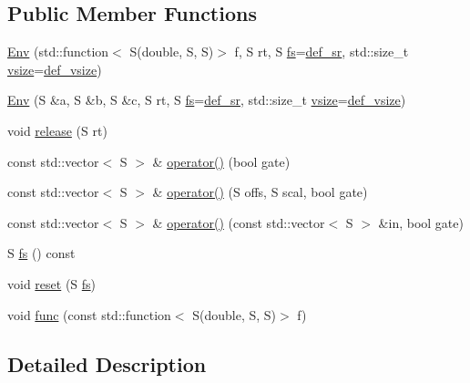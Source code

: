 \subsection*{Public Member Functions}
\begin{DoxyCompactItemize}
\item 
\hyperlink{class_aurora_1_1_env_a500fe7e05d736a21c801ffa480aceed7}{Env} (std\+::function$<$ S(double, S, S)$>$ f, S rt, S \hyperlink{class_aurora_1_1_env_a8b83ca686cce4fc31b03b1de847bc062}{fs}=\hyperlink{namespace_aurora_ad49263d809bea98dd422e95bc91bc03e}{def\+\_\+sr}, std\+::size\+\_\+t \hyperlink{class_aurora_1_1_snd_base_af9e21aaf411b17f7a8221c991ce5d291}{vsize}=\hyperlink{namespace_aurora_afaaddf667a06e7ce23c667a8b7295263}{def\+\_\+vsize})
\item 
\hyperlink{class_aurora_1_1_env_a3ea4ee867e90f80331819cceacc55942}{Env} (S \&a, S \&b, S \&c, S rt, S \hyperlink{class_aurora_1_1_env_a8b83ca686cce4fc31b03b1de847bc062}{fs}=\hyperlink{namespace_aurora_ad49263d809bea98dd422e95bc91bc03e}{def\+\_\+sr}, std\+::size\+\_\+t \hyperlink{class_aurora_1_1_snd_base_af9e21aaf411b17f7a8221c991ce5d291}{vsize}=\hyperlink{namespace_aurora_afaaddf667a06e7ce23c667a8b7295263}{def\+\_\+vsize})
\item 
void \hyperlink{class_aurora_1_1_env_a2e52ca727b587d89e13a6c3832786f22}{release} (S rt)
\item 
const std\+::vector$<$ S $>$ \& \hyperlink{class_aurora_1_1_env_ae4e2dec694f0be0f0efa5b073a06fef5}{operator()} (bool gate)
\item 
const std\+::vector$<$ S $>$ \& \hyperlink{class_aurora_1_1_env_a664e3c6ce7e66de66305ab220c116792}{operator()} (S offs, S scal, bool gate)
\item 
const std\+::vector$<$ S $>$ \& \hyperlink{class_aurora_1_1_env_aa60b54171a8ae1757d447aa42d5d00c7}{operator()} (const std\+::vector$<$ S $>$ \&in, bool gate)
\item 
S \hyperlink{class_aurora_1_1_env_a8b83ca686cce4fc31b03b1de847bc062}{fs} () const
\item 
void \hyperlink{class_aurora_1_1_env_a12db5d285b749a7e1fed988d344d3bc9}{reset} (S \hyperlink{class_aurora_1_1_env_a8b83ca686cce4fc31b03b1de847bc062}{fs})
\item 
void \hyperlink{class_aurora_1_1_env_a92aec91bb78127cf50d5d841870cce14}{func} (const std\+::function$<$ S(double, S, S)$>$ f)
\end{DoxyCompactItemize}


\subsection{Detailed Description}

